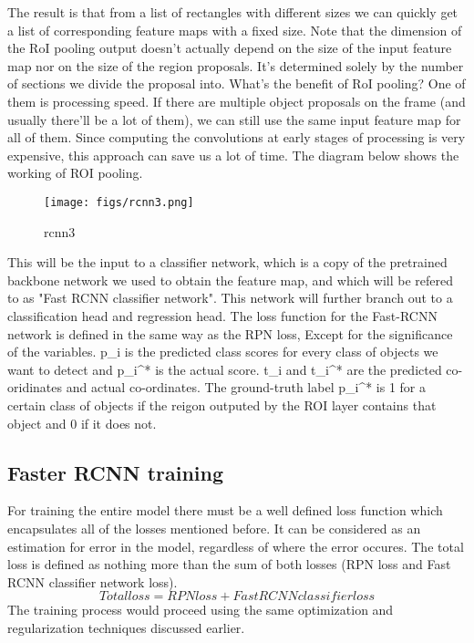 The result is that from a list of rectangles with different sizes we can quickly get a list of corresponding feature maps with a fixed size. Note that the dimension of the RoI pooling output doesn’t actually depend on the size of the input feature map nor on the size of the region proposals. It’s determined solely by the number of sections we divide the proposal into. What’s the benefit of RoI pooling? One of them is processing speed. If there are multiple object proposals on the frame (and usually there’ll be a lot of them), we can still use the same input feature map for all of them. Since computing the convolutions at early stages of processing is very expensive, this approach can save us a lot of time. The diagram below shows the working of ROI pooling.
\begin{figure}[ht]
	\centering
	\texttt{[image: figs/rcnn3.png]}
	\caption{rcnn3}\label{fig:rcnn3}
\end{figure}
This will be the input to a classifier network, which is a copy of the pretrained backbone network we used to obtain the feature map, and which will be refered to as "Fast RCNN classifier network". This network will further branch out to a classification head and regression head. The loss function for the Fast-RCNN
 network is defined in the same way as the RPN loss, Except for the significance of the variables. p_{i} is the predicted class scores for every class of objects we want to detect and p_{i}^* is the actual score. t_{i} and t_{i}^* are the predicted co-oridinates and actual co-ordinates. The ground-truth label p_{i}^* is 1 for a certain class of objects if the reigon outputed by the ROI layer contains that object and 0 if it does not.
\subsection{Faster RCNN training}
For training the entire model there must be a well defined loss function which encapsulates all of the losses mentioned before. It can be considered as an estimation for
error in the model, regardless of where the error occures. The total loss is defined as nothing more than the sum of both losses (RPN loss and Fast RCNN classifier network loss).
$$
Total loss = RPN loss + Fast RCNN classifier loss
$$
The training process would proceed using the same optimization and regularization techniques discussed earlier.
